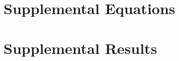 \documentclass[review,3p,authoryear]{elsarticle}
\begin{document}
\section{Supplemental Equations}\label{a:eqs}

\clearpage
\section{Supplemental Results}\label{a:results}

\clearpage
\end{document}
